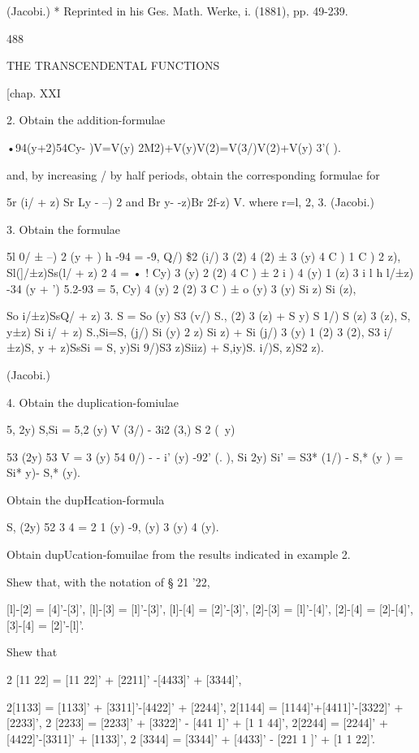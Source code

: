 (Jacobi.) * Reprinted in his Ges. Math. Werke, i. (1881), pp. 49-239.

488

THE TRANSCENDENTAL FUNCTIONS

[chap. XXI

2. Obtain the addition-formulae

•94(y+2)54Cy- )V=V(y) 2M2)+V(y)V(2)=V(3/)V(2)+V(y) 3'( ).

and, by increasing / by half periods, obtain the corresponding
formulae for

5r (i/ + z) Sr Ly - --) 2 and Br y- -z)Br 2f-z) V. where r=l, 2, 3.
(Jacobi.)

3. Obtain the formulae

5l 0/ ± --) 2 (y + ) h -94 = -9, Q/) \$2 (i/) 3 (2) 4 (2) ± 3 (y) 4 C
) 1 C ) 2 z), Sl(]/±z)Ss(l/ + z) 2 4 = • ! Cy) 3 (y) 2 (2) 4 C ) ± 2 i
) 4 (y) 1 (z) 3 i l h l/±z) -34 (y + ') 5.2-93 = 5, Cy) 4 (y) 2 (2) 3
C ) ± o (y) 3 (y) Si z) Si (z),

So i/±z)SsQ/ + z) 3. S = So (y) S3 (v/) S., (2) 3 (z) + S y) S 1/) S
(z) 3 (z), S, y±z) Si i/ + z) S.,Si=S, (j/) Si (y) 2 z) Si z) + Si
(j/) 3 (y) 1 (2) 3 (2), S3 i/±z)S, y + z)SsSi = S, y)Si 9/)S3 z)Siiz)
+ S,iy)S. i/)S, z)S2 z).

(Jacobi.)

4. Obtain the duplication-fomiulae

5, 2y) S,Si = 5,2 (y) V (3/) - 3i2 (3,) S 2 (\ y)

53 (2y) 53 V = 3 (y) 54 0/) - - i' (y) -92' (. ), Si 2y) Si' = S3*
(1/) - S,* (y ) = Si* y)- S,* (y).

Obtain the dupHcation-formula

S, (2y) 52 3 4 = 2 1 (y) -9, (y) 3 (y) 4 (y).

Obtain dupUcation-fomuilae from the results indicated in example 2.

Shew that, with the notation of § 21 '22,

[l]-[2] = [4]'-[3]', [l]-[3] = [l]'-[3]', [l]-[4] = [2]'-[3]', [2]-[3]
= [l]'-[4]', [2]-[4] = [2]-[4]', [3]-[4] = [2]'-[l]'.

Shew that

2 [11 22] = [11 22]' + [2211]' -[4433]' + [3344]',

2[1133] = [1133]' + [3311]'-[4422]' + [2244]', 2[1144] =
[1144]'+[4411]'-[3322]' + [2233]', 2 [2233] = [2233]' + [3322]' - [441
1]' + [1 1 44]', 2[2244] = [2244]' + [4422]'-[3311]' + [1133]', 2
[3344] = [3344]' + [4433]' - [221 1 ]' + [1 1 22]'.

